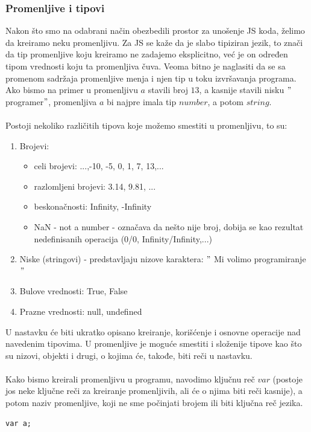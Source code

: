 \documentclass[a4paper]{article}
\begin{document}
\subsubsection{Promenljive i tipovi}
Nakon što smo na odabrani način obezbedili prostor za unošenje JS koda, želimo da kreiramo neku promenljivu. Za JS se kaže da je slabo tipiziran jezik, to znači da tip promenljive koju kreiramo ne zadajemo eksplicitno, već je on određen tipom vrednosti koju ta promenljiva čuva. Veoma bitno je naglasiti da se sa promenom sadržaja promenljive menja i njen tip u toku izvršavanja programa. Ako bismo na primer u promenljivu $a$ stavili broj $13$, a kasnije stavili nisku $"$programer$"$, promenljiva $a$ bi najpre imala tip $number$, a potom $string$.\\\\
Postoji nekoliko različitih tipova koje možemo smestiti u promenljivu, to su:
\begin{enumerate}
    \item Brojevi: 
    \begin{itemize}
        \item celi brojevi: ...,-10, -5, 0, 1, 7, 13,...
        \item razlomljeni brojevi: 3.14, 9.81, ...
        \item beskonačnosti: Infinity, -Infinity
        \item NaN - not a number - označava da nešto nije broj, dobija se kao rezultat nedefinisanih operacija (0/0, Infinity/Infinity,...) 
    \end{itemize}
    \item Niske (stringovi) - predstavljaju nizove karaktera: $"$ Mi volimo programiranje $"$
    \item Bulove vrednosti: True, False
    \item Prazne vrednosti: null, undefined
\end{enumerate}
U nastavku će biti ukratko opisano kreiranje, korišćenje i osnovne operacije nad navedenim tipovima. U promenljive je moguće smestiti i složenije tipove kao što su nizovi, objekti i drugi, o kojima će, takođe, biti reči u nastavku.\\\\
Kako bismo kreirali promenljivu u programu, navodimo ključnu reč $var$ (postoje jos neke ključne reči za kreiranje promenljivih, ali će o njima biti reči kasnije), a potom naziv promenljive, koji ne sme počinjati brojem ili biti ključna reč jezika.
\begin{verbatim}
var a;
\end{verbatim}
\end{document}
